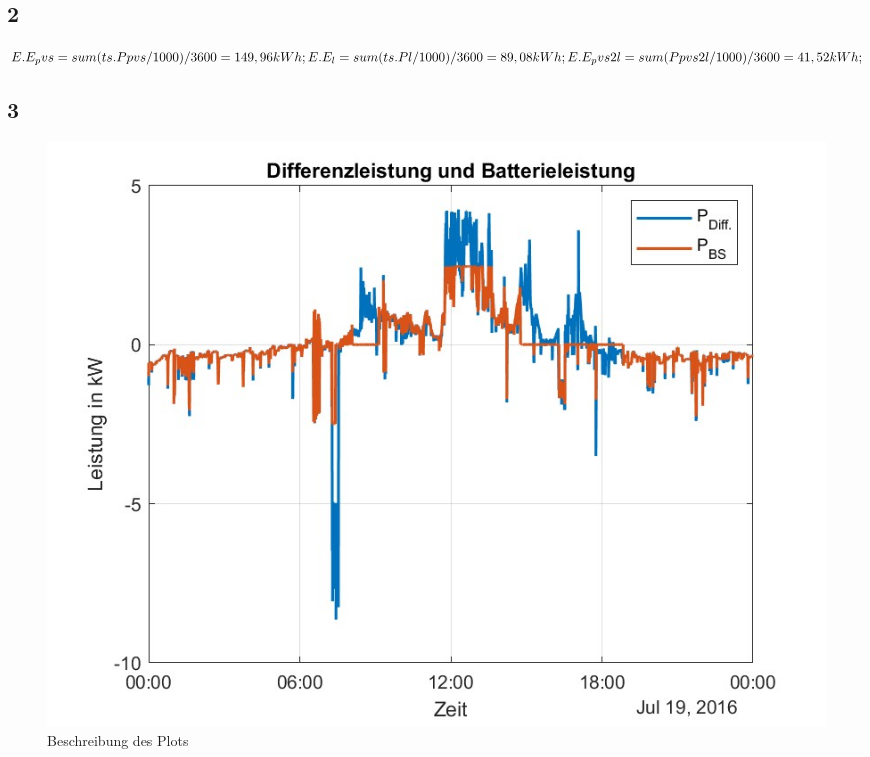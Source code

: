 \subsection{2}
$E.E_pvs = sum(ts.Ppvs/1000)/3600=149,96kWh;\\
E.E_l = sum(ts.Pl/1000)/3600=89,08kWh;\\
E.E_pvs2l = sum(Ppvs2l/1000)/3600=41,52kWh;$\\

\subsection{3}
\begin{figure}[H]
    \centering
    \includegraphics[width=\textwidth]{Abbildungen/plot_vorbereitungsfrage3.jpg}
    \caption{Beschreibung des Plots}
    \label{fig:plot3062023}
\end{figure}
